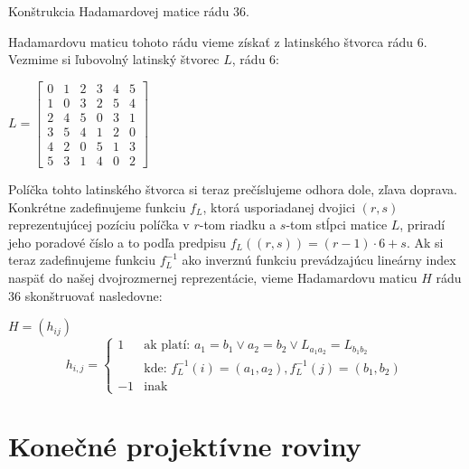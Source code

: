 \begin{theorem}
\label{th:hm_36}
Konštrukcia Hadamardovej matice rádu 36.
\end{theorem}

\begin{construction}
Hadamardovu maticu tohoto rádu vieme získať z latinského štvorca rádu 6. Vezmime si ľubovolný latinský štvorec $L$, rádu 6:

\begin{center}
$L = \begin{bmatrix}
0 & 1 & 2 & 3 & 4 & 5\\
1 & 0 & 3 & 2 & 5 & 4\\
2 & 4 & 5 & 0 & 3 & 1\\
3 & 5 & 4 & 1 & 2 & 0\\
4 & 2 & 0 & 5 & 1 & 3\\
5 & 3 & 1 & 4 & 0 & 2
\end{bmatrix}$
\end{center}

Políčka tohto latinského štvorca si teraz prečíslujeme odhora dole, zľava doprava. Konkrétne zadefinujeme funkciu $f_L$, ktorá
usporiadanej dvojici $(r, s)$ reprezentujúcej pozíciu políčka v $r$-tom riadku a $s$-tom stĺpci matice $L$, priradí jeho poradové číslo
a to podľa predpisu $f_L((r, s)) = (r-1)\cdot6+s$. Ak si teraz zadefinujeme funkciu $f_L^{-1}$ ako inverznú funkciu prevádzajúcu lineárny
index naspäť do našej dvojrozmernej reprezentácie, vieme Hadamardovu maticu $H$ rádu 36 skonštruovať nasledovne:

\begin{center}
$H = (h_{ij})$
\begin{equation*}
    h_{i, j} = \begin{cases}
               1               & \text{ak platí}: \, a_1=b_1 \lor a_2=b_2 \lor L_{a_1a_2} = L_{b_1b_2}
               \\              & \text{kde}: \, f_L^{-1}(i) = (a_1, a_2), f_L^{-1}(j) = (b_1, b_2)
               \\-1            & \text{inak}
           \end{cases}
\end{equation*}
\end{center}

\end{construction}

\section{Konečné projektívne roviny}


